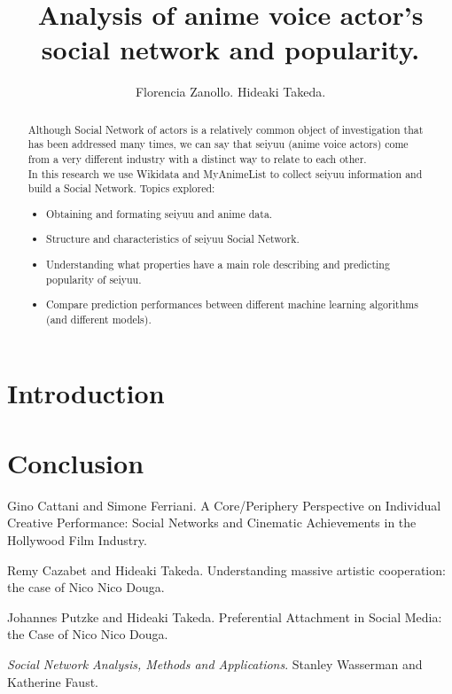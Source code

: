 \documentclass[a4paper]{report}
\begin{document}
	\title{Analysis of anime voice actor's social network and popularity.}
	\author{Florencia Zanollo. Hideaki Takeda.}
	
\maketitle

\tableofcontents

\begin{abstract}
	Although Social Network of actors is a relatively common object of investigation that has been addressed many times, we can say that seiyuu (anime voice actors) come from a very different industry with a distinct way to relate to each other. \\
	In this research we use Wikidata and MyAnimeList to collect seiyuu information and build a Social Network. Topics explored:
	\begin{itemize}
	\item Obtaining and formating seiyuu and anime data.
	\item Structure and characteristics of seiyuu Social Network.
	\item Understanding what properties have a main role describing and predicting popularity of seiyuu.
	\item Compare prediction performances between different machine learning algorithms (and different models).
	\end{itemize}
\end{abstract}

\chapter*{Introduction}






\chapter*{Conclusion}

	

\begin{thebibliography}{5}
	Gino Cattani and Simone Ferriani. A Core/Periphery Perspective on Individual Creative Performance: Social Networks and Cinematic Achievements in the Hollywood Film Industry.
	
	Remy Cazabet and Hideaki Takeda. Understanding massive artistic cooperation: the case of Nico Nico Douga.

	Johannes Putzke and Hideaki Takeda. Preferential Attachment in Social Media: the Case of Nico Nico Douga.

	{\em Social Network Analysis, Methods and Applications}. Stanley Wasserman and Katherine Faust. 
	
\end{thebibliography}
\end{document}

